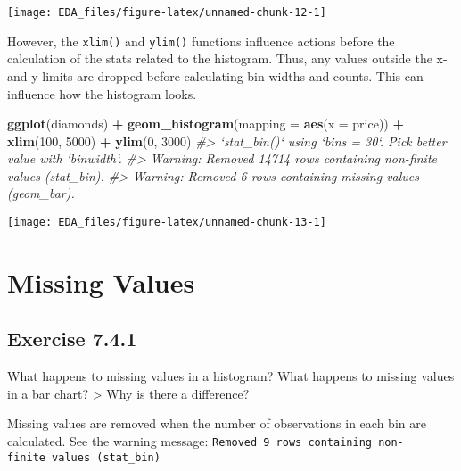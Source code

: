 \documentclass[]{book}
\newenvironment{Shaded}{\begin{snugshade}}{\end{snugshade}}
\newcommand{\CommentTok}[1]{\textcolor[rgb]{0.56,0.35,0.01}{\textit{#1}}}
\newcommand{\DataTypeTok}[1]{\textcolor[rgb]{0.13,0.29,0.53}{#1}}
\newcommand{\DecValTok}[1]{\textcolor[rgb]{0.00,0.00,0.81}{#1}}
\newcommand{\KeywordTok}[1]{\textcolor[rgb]{0.13,0.29,0.53}{\textbf{#1}}}
\newcommand{\NormalTok}[1]{#1}
\newcommand{\OperatorTok}[1]{\textcolor[rgb]{0.81,0.36,0.00}{\textbf{#1}}}
\newcommand{\StringTok}[1]{\textcolor[rgb]{0.31,0.60,0.02}{#1}}
\theoremstyle{plain}
\theoremstyle{remark}
\begin{document}
\begin{center}\texttt{[image: EDA\_files/figure-latex/unnamed-chunk-12-1]} \end{center}

However, the \texttt{xlim()} and \texttt{ylim()} functions influence
actions before the calculation of the stats related to the histogram.
Thus, any values outside the x- and y-limits are dropped before
calculating bin widths and counts. This can influence how the histogram
looks.

\begin{Shaded}
\begin{Highlighting}[]
\KeywordTok{ggplot}\NormalTok{(diamonds) }\OperatorTok{+}
\StringTok{  }\KeywordTok{geom_histogram}\NormalTok{(}\DataTypeTok{mapping =} \KeywordTok{aes}\NormalTok{(}\DataTypeTok{x =}\NormalTok{ price)) }\OperatorTok{+}
\StringTok{  }\KeywordTok{xlim}\NormalTok{(}\DecValTok{100}\NormalTok{, }\DecValTok{5000}\NormalTok{) }\OperatorTok{+}
\StringTok{  }\KeywordTok{ylim}\NormalTok{(}\DecValTok{0}\NormalTok{, }\DecValTok{3000}\NormalTok{)}
\CommentTok{#> `stat_bin()` using `bins = 30`. Pick better value with `binwidth`.}
\CommentTok{#> Warning: Removed 14714 rows containing non-finite values (stat_bin).}
\CommentTok{#> Warning: Removed 6 rows containing missing values (geom_bar).}
\end{Highlighting}
\end{Shaded}

\begin{center}\texttt{[image: EDA\_files/figure-latex/unnamed-chunk-13-1]} \end{center}

\hypertarget{missing-values}{%
\section{Missing Values}\label{missing-values}}

\hypertarget{exercise-7.4.1}{%
\subsection*{\texorpdfstring{Exercise
{7.4.1}}{Exercise 7.4.1}}\label{exercise-7.4.1}}

What happens to missing values in a histogram? What happens to missing
values in a bar chart? \textgreater{} Why is there a difference?

Missing values are removed when the number of observations in each bin
are calculated. See the warning message:
\texttt{Removed\ 9\ rows\ containing\ non-finite\ values\ (stat\_bin)}
\end{document}
